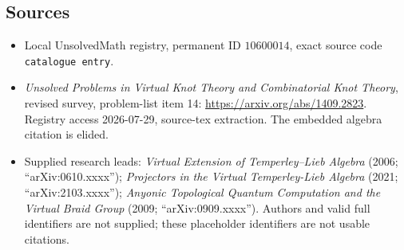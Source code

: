 \documentclass[11pt]{article}
\begin{document}
\subsection{Sources}
\begin{itemize}
\item Local UnsolvedMath registry, permanent ID \(10600014\), exact source code \texttt{catalogue entry}.
\item \emph{Unsolved Problems in Virtual Knot Theory and Combinatorial Knot Theory}, revised survey, problem-list item 14: \url{https://arxiv.org/abs/1409.2823}. Registry access 2026-07-29, source-tex extraction. The embedded algebra citation is elided.
\item Supplied research leads: \emph{Virtual Extension of Temperley--Lieb Algebra} (2006; ``arXiv:0610.xxxx''); \emph{Projectors in the Virtual Temperley-Lieb Algebra} (2021; ``arXiv:2103.xxxx''); \emph{Anyonic Topological Quantum Computation and the Virtual Braid Group} (2009; ``arXiv:0909.xxxx''). Authors and valid full identifiers are not supplied; these placeholder identifiers are not usable citations.
\end{itemize}
\end{document}
